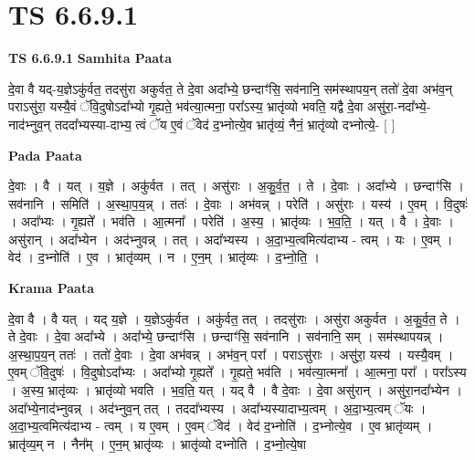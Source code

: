 \documentclass[17pt]{extarticle}
\begin{document}
\section{ TS 6.6.9.1 }

\textbf{TS 6.6.9.1 } \newline
\textbf{Samhita Paata} \newline

दे॒वा वै यद्-य॒ज्ञेऽकु॑र्वत॒ तदसु॑रा अकुर्वत॒ ते दे॒वा अदा᳚भ्ये॒ छन्दाꣳ॑सि॒ सव॑नानि॒ सम॑स्थापय॒न् ततो॑ दे॒वा अभ॑व॒न् पराऽसु॑रा॒ यस्यै॒वं ॅवि॒दुषोऽदा᳚भ्यो गृ॒ह्यते॒ भव॑त्या॒त्मना॒ परा᳚ऽस्य॒ भ्रातृ॑व्यो भवति॒ यद्वै दे॒वा असु॑रा॒-नदा᳚भ्ये॒-नाद॑भ्नुव॒न् तददा᳚भ्यस्या-दाभ्य॒ त्वं ॅय ए॒वं ॅवेद॑ द॒भ्नोत्ये॒व भ्रातृ॑व्यं॒ नैनं॒ भ्रातृ॑व्यो दभ्नोत्ये॒- [  ] \newline

\textbf{Pada Paata} \newline

दे॒वाः । वै । यत् । य॒ज्ञे । अकु॑र्वत । तत् । असु॑राः । अ॒कु॒र्व॒त॒ । ते । दे॒वाः । अदा᳚भ्ये । छन्दाꣳ॑सि । सव॑नानि । समिति॑ । अ॒स्था॒प॒य॒न्न् । ततः॑ । दे॒वाः । अभ॑वन्न् । परेति॑ । असु॑राः । यस्य॑ । ए॒वम् । वि॒दुषः॑ । अदा᳚भ्यः । गृ॒ह्यते᳚ । भव॑ति । आ॒त्मना᳚ । परेति॑ । अ॒स्य॒ । भ्रातृ॑व्यः । भ॒व॒ति॒ । यत् । वै । दे॒वाः । असु॑रान् । अदा᳚भ्येन । अद॑भ्नुवन्न् । तत् । अदा᳚भ्यस्य । अ॒दा॒भ्य॒त्वमित्य॑दाभ्य - त्वम् । यः । ए॒वम् । वेद॑ । द॒भ्नोति॑ । ए॒व । भ्रातृ॑व्यम् । न । ए॒न॒म् । भ्रातृ॑व्यः । द॒भ्नो॒ति॒ ।  \newline


\textbf{Krama Paata} \newline

दे॒वा वै । वै यत् । यद् य॒ज्ञे । य॒ज्ञेऽकु॑र्वत । अकु॑र्वत॒ तत् । तदसु॑राः । असु॑रा अकुर्वत । अ॒कु॒र्व॒त॒ ते । ते दे॒वाः । दे॒वा अदा᳚भ्ये । अदा᳚भ्ये॒ छन्दाꣳ॑सि । छन्दाꣳ॑सि॒ सव॑नानि । सव॑नानि॒ सम् । सम॑स्थापयन्न् । अ॒स्था॒प॒य॒न् ततः॑ । ततो॑ दे॒वाः । दे॒वा अभ॑वन्न् । अभ॑व॒न् परा᳚ । पराऽसु॑राः । असु॑रा॒ यस्य॑ । यस्यै॒वम् । ए॒वम् ॅवि॒दुषः॑ । वि॒दुषोऽदा᳚भ्यः । अदा᳚भ्यो गृ॒ह्यते᳚ । गृ॒ह्यते॒ भव॑ति । भव॑त्या॒त्मना᳚ । आ॒त्मना॒ परा᳚ । परा᳚ऽस्य । अ॒स्य॒ भ्रातृ॑व्यः । भ्रातृ॑व्यो भवति । भ॒व॒ति॒ यत् । यद् वै । वै दे॒वाः । दे॒वा असु॑रान् । असु॑रा॒नदा᳚भ्येन । अदा᳚भ्ये॒नाद॑भ्नुवन्न् । अद॑भ्नुव॒न् तत् । तददा᳚भ्यस्य । अदा᳚भ्यस्यादाभ्य॒त्वम् । अ॒दा॒भ्य॒त्वम् ॅयः । अ॒दा॒भ्य॒त्वमित्य॑दाभ्य - त्वम् । य ए॒वम् । ए॒वम् ॅवेद॑ । वेद॑ द॒भ्नोति॑ । द॒भ्नोत्ये॒व । ए॒व भ्रातृ॑व्यम् । भ्रातृ॑व्य॒म् न । नैन᳚म् । ए॒न॒म् भ्रातृ॑व्यः । भ्रातृ॑व्यो दभ्नोति । द॒भ्नो॒त्ये॒षा \newline
\end{document}
